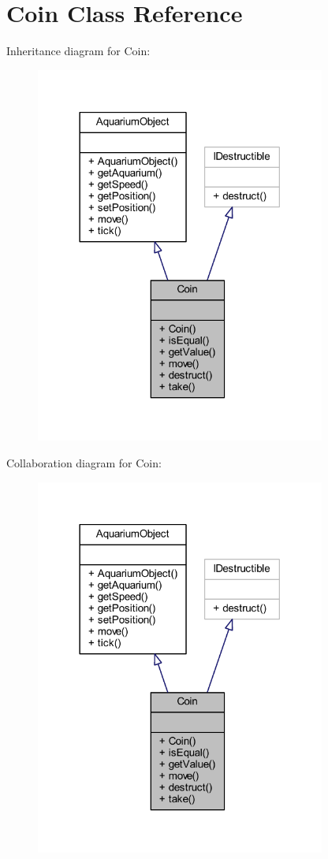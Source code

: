 \hypertarget{class_coin}{}\section{Coin Class Reference}
\label{class_coin}


Inheritance diagram for Coin\+:
\nopagebreak
\begin{figure}[H]
\begin{center}
\leavevmode
\includegraphics[width=270pt]{class_coin__inherit__graph}
\end{center}
\end{figure}


Collaboration diagram for Coin\+:
\nopagebreak
\begin{figure}[H]
\begin{center}
\leavevmode
\includegraphics[width=270pt]{class_coin__coll__graph}
\end{center}
\end{figure}
